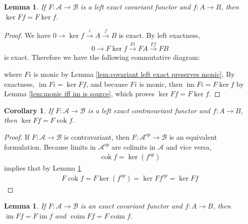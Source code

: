 \documentclass{article}
\newcommand{\fA}{\mathscr{A}}
\newcommand{\fB}{\mathscr{B}}
\DeclareMathOperator{\im}{\mathrm{im}}
\DeclareMathOperator{\coim}{\mathrm{coim}}
\DeclareMathOperator{\cok}{\mathrm{cok}}
\newtheorem{corollary}{Corollary}[theorem]
\newtheorem{lemma}[theorem]{Lemma}
\begin{document}
\begin{lemma}\label{lem:covariant left exact commutes with ker}
    If $F:\fA \to \fB$ is a left exact covariant functor and $f:A\to B$, then $\ker Ff=F\ker f$.
\end{lemma}
\begin{proof}
    We have $0\rightarrow \ker f\xrightarrow{i} A\xrightarrow{f}B$ is exact. By left exactness,
    \begin{align*}
        0\rightarrow F\ker f \xrightarrow{Fi} FA \xrightarrow{Ff} FB
    \end{align*}
    is exact. Therefore we have the following commutative diagram:
    \begin{center}
    \end{center}
    where $Fi$ is monic by Lemma \ref{lem:covariant left exact preserves monic}. By exactness, $\im Fi=\ker Ff$, and because $Fi$ is monic, then $\im Fi=F\ker f$ by Lemma \ref{lem:monic iff im is source}, which proves $\ker Ff=F\ker f$.
\end{proof}
\begin{corollary}\label{cor:contravariant left exact and cok to ker}
    If $F:\fA \to \fB$ is a left exact contravariant functor and $f:A\to B$, then $\ker Ff=F\cok f$.
\end{corollary}
\begin{proof}
    If $F:\fA \to \fB$ is contravariant, then $F:\fA^{op}\to \fB$ is an equivalent formulation. Because limits in $\fA^{op}$ are colimits in $\fA$ and vice versa,
    \begin{align*}
        \cok f=\ker (f^{op})
    \end{align*}
    implies that by Lemma \ref{lem:covariant left exact commutes with ker}
    \begin{align*}
        F\cok f=F\ker (f^{op})=\ker Ff^{op}=\ker Ff
    \end{align*}
\end{proof}
\begin{lemma}\label{lem:covariant exact and commutes with im and coim}
    If $F:\fA \to \fB$ is an exact covariant functor and $f:A\to B$, then $\im Ff=F\im f$ and $\coim Ff=F\coim f$.
\end{lemma}
\end{document}
